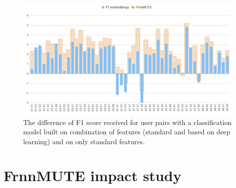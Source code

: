 \begin{figure}[h]
    \centering
    \includegraphics[width=15cm]{Images/f1-diff-frnnmute-ft.png}
    \caption{The difference of F1 score received for user pairs with a classification model built on combination of features (standard and based on deep learning) and on only standard features. }
    \label{fig:f1-diff-frnnmute-ft}
\end{figure} 


\section{FrnnMUTE impact study}
\label{sec:frnnmute-study}

